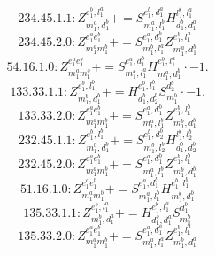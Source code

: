 \documentclass[letterpaper,10pt,fleqn,leqno,onecolumn]{article}
\begin{document}
\begin{equation} \;\;\;\;\;\;  234.45.1.1: Z^{e_{1}^{b},l_{1}^{a}}_{m_{1}^{a},d_{1}^{b}}+=S^{e_{1}^{b},d_{1}^{a}}_{m_{1}^{a},l_{1}^{b}}H^{l_{1}^{b},l_{1}^{a}}_{d_{1}^{b},d_{1}^{a}} \end{equation}
\begin{equation} \;\;\;\;\;\;  234.45.2.0: Z^{e_{1}^{a}e_{1}^{b}}_{m_{1}^{a}m_{1}^{b}}+=S^{e_{1}^{a},d_{1}^{b}}_{m_{1}^{b},l_{1}^{a}}Z^{e_{1}^{b},l_{1}^{a}}_{m_{1}^{a},d_{1}^{b}} \end{equation}
\begin{equation} \;\;\;\;\;\;  54.16.1.0: Z^{e_{1}^{a}e_{1}^{b}}_{m_{1}^{a}m_{1}^{b}}+=S^{e_{1}^{a},d_{1}^{b}}_{m_{1}^{b},l_{1}^{a}}H^{e_{1}^{b},l_{1}^{a}}_{m_{1}^{a},d_{1}^{b}}\cdot -1. \end{equation}
\begin{equation} \;\;\;\;\;\;  133.33.1.1: Z^{e_{1}^{b},l_{1}^{b}}_{m_{1}^{b},d_{1}^{b}}+=H^{e_{1}^{b},l_{1}^{b}}_{d_{1}^{b},d_{2}^{b}}S^{d_{2}^{b}}_{m_{1}^{b}}\cdot -1. \end{equation}
\begin{equation} \;\;\;\;\;\;  133.33.2.0: Z^{e_{1}^{a}e_{1}^{b}}_{m_{1}^{a}m_{1}^{b}}+=S^{e_{1}^{a},d_{1}^{b}}_{m_{1}^{a},l_{1}^{b}}Z^{e_{1}^{b},l_{1}^{b}}_{m_{1}^{b},d_{1}^{b}} \end{equation}
\begin{equation} \;\;\;\;\;\;  232.45.1.1: Z^{e_{1}^{b},l_{1}^{b}}_{m_{1}^{b},d_{1}^{b}}+=S^{e_{1}^{b},d_{2}^{b}}_{m_{1}^{b},l_{2}^{b}}H^{l_{1}^{b},l_{2}^{b}}_{d_{1}^{b},d_{2}^{b}} \end{equation}
\begin{equation} \;\;\;\;\;\;  232.45.2.0: Z^{e_{1}^{a}e_{1}^{b}}_{m_{1}^{a}m_{1}^{b}}+=S^{e_{1}^{a},d_{1}^{b}}_{m_{1}^{a},l_{1}^{b}}Z^{e_{1}^{b},l_{1}^{b}}_{m_{1}^{b},d_{1}^{b}} \end{equation}
\begin{equation} \;\;\;\;\;\;  51.16.1.0: Z^{e_{1}^{a}e_{1}^{b}}_{m_{1}^{a}m_{1}^{b}}+=S^{e_{1}^{a},d_{1}^{b}}_{m_{1}^{a},l_{1}^{b}}H^{e_{1}^{b},l_{1}^{b}}_{m_{1}^{b},d_{1}^{b}} \end{equation}
\begin{equation} \;\;\;\;\;\;  135.33.1.1: Z^{e_{1}^{b},l_{1}^{a}}_{m_{1}^{b},d_{1}^{a}}+=H^{e_{1}^{b},l_{1}^{a}}_{d_{1}^{b},d_{1}^{a}}S^{d_{1}^{b}}_{m_{1}^{b}} \end{equation}
\begin{equation} \;\;\;\;\;\;  135.33.2.0: Z^{e_{1}^{a}e_{1}^{b}}_{m_{1}^{a}m_{1}^{b}}+=S^{e_{1}^{a},d_{1}^{a}}_{m_{1}^{a},l_{1}^{a}}Z^{e_{1}^{b},l_{1}^{a}}_{m_{1}^{b},d_{1}^{a}} \end{equation}
\end{document}
